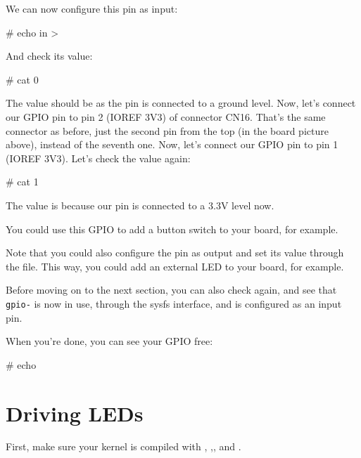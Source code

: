 We can now configure this pin as input:

\begin{bashinput}
# echo in > %
\end{bashinput}

And check its value:

\begin{bashinput}
# cat %
0
\end{bashinput}

The value should be  as the pin is connected to a ground level.
\if{}
Now, let's connect our GPIO pin to pin 2 (IOREF 3V3) of connector CN16.
That's the same connector as before, just the second pin from the top
(in the board picture above), instead of the seventh one.
\fi
\if{}
Now, let's connect our GPIO pin to pin 1 (IOREF 3V3).
\fi
Let's check the value again:

\begin{bashinput}
# cat %
1
\end{bashinput}

The value is  because our pin is connected to a 3.3V level now.

You could use this GPIO to add a button switch to your board, for
example.

Note that you could also configure the pin as output and set its value
through the  file. This way, you could add an external LED
to your board, for example.

Before moving on to the next section, you can also check
 again, and see that {\tt gpio-\gpionum} is now
in use, through the sysfs interface, and is configured as an input pin.

When you're done, you can see your GPIO free:

\begin{bashinput}
# echo %
\end{bashinput}

\section{Driving LEDs}

First, make sure your kernel is compiled with
, 
,, 
and .

